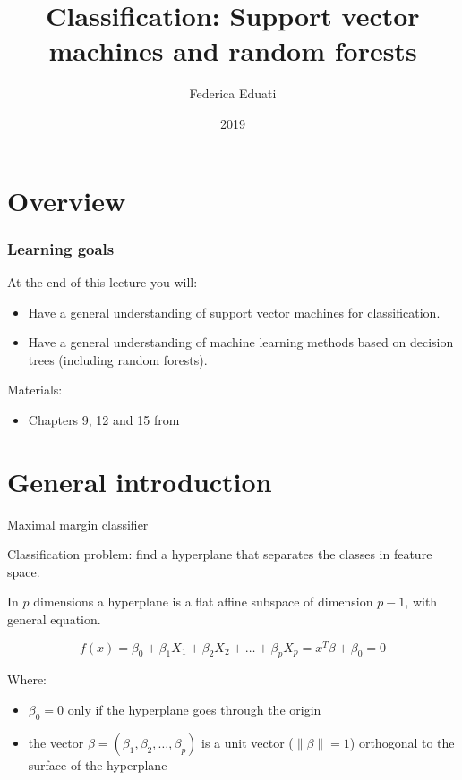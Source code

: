 \documentclass[notes]{beamer}          %
\title{Classification: Support vector machines and random forests}
\author{Federica Eduati}
\institute{Eindhoven University of Technology

Department of Biomedical Engineering}
\date{2019}
\newcommand{\norm}[1]{\left\lVert#1\right\rVert}
\providecommand{\norm}[1]{\lVert#1\rVert}
\begin{document}
 
\frame{\titlepage}
 
\section{Overview}

\begin{frame}
\frametitle{Learning goals}
At the end of this lecture you will:
\begin{itemize}
    \item Have a general understanding of support vector machines for classification.
    \item Have a general understanding of machine learning methods based on decision trees (including random forests).
\end{itemize}

\vspace{5mm} 

Materials: 
\begin{itemize}
    \item Chapters 9, 12 and 15 from \cite{elements}
\end{itemize}

\end{frame}


\section{General introduction}
\begin{frame}{Maximal margin classifier}

Classification problem: find a hyperplane that separates the classes in feature space.

\vspace{5mm} 

In $p$ dimensions a hyperplane is a flat affine subspace of dimension $p-1$, with general equation.

\begin{equation}
    f(x) = \beta_0 + \beta_1 X_1 + \beta_2 X_2 + \dots + \beta_p X_p = x^T\beta + \beta_0 = 0
\end{equation}

Where:
\begin{itemize}
    \item $\beta_0 = 0$ only if the hyperplane goes through the origin \item the vector $\beta = (\beta_1, \beta_2, \dots, \beta_p)$ is a unit vector ($\norm{\beta} = 1$) orthogonal to the surface of the hyperplane
\end{itemize}
    
\end{frame}
\end{document}
